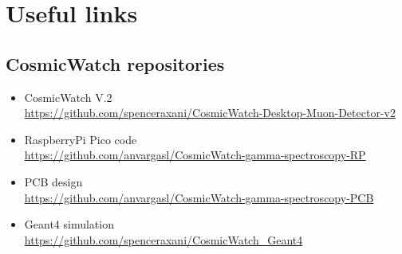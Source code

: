 \chapter{Useful links}\label{app:useful_links}

\section{CosmicWatch repositories}

\begin{itemize}
    \item CosmicWatch V.2 \\ \href{https://github.com/spenceraxani/CosmicWatch-Desktop-Muon-Detector-v2}{https://github.com/spenceraxani/CosmicWatch-Desktop-Muon-Detector-v2}
    \item RaspberryPi Pico code \\ \href{https://github.com/anvargasl/CosmicWatch-gamma-spectroscopy-RP}{https://github.com/anvargasl/CosmicWatch-gamma-spectroscopy-RP}
    \item PCB design \\ \href{https://github.com/anvargasl/CosmicWatch-gamma-spectroscopy-PCB}{https://github.com/anvargasl/CosmicWatch-gamma-spectroscopy-PCB}
    \item Geant4 simulation \\ \href{https://github.com/spenceraxani/CosmicWatch_Geant4}{https://github.com/spenceraxani/CosmicWatch\_Geant4}
\end{itemize}